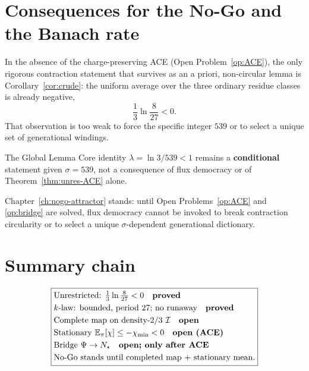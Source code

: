 \section{Consequences for the No-Go and the Banach rate}
\label{sec:conseq}

\begin{theorem}
\label{thm:only-qual}
In the absence of the charge-preserving ACE
(Open Problem~\ref{op:ACE}), the only rigorous contraction statement that
survives as an a priori, non-circular lemma is
Corollary~\ref{cor:crude}: the uniform average over the three ordinary residue
classes is already negative,
\[
\frac13\ln\frac{8}{27}<0.
\]
That observation is too weak to force the specific integer \(539\) or to select
a unique set of generational windings.
\end{theorem}

\begin{corollary}
\label{cor:banach-cond}
The Global Lemma Core identity \(\lambda=\ln 3/539<1\) remains a
\textbf{conditional} statement given \(\sigma=539\), not a consequence of
flux democracy or of Theorem~\ref{thm:unres-ACE} alone.
\end{corollary}

\begin{corollary}[No-Go unchanged]
\label{cor:nogo-stands}
Chapter~\ref{ch:nogo-attractor} stands: until Open Problems~\ref{op:ACE} and
\ref{op:bridge} are solved, flux democracy cannot be invoked to break
contraction circularity or to select a unique \(\sigma\)-dependent generational
dictionary.
\end{corollary}

\section{Summary chain}
\label{sec:ace-summary}

\begin{equation}
\boxed{
\begin{aligned}
&\text{Unrestricted: }
\tfrac13\ln\tfrac{8}{27}<0
\quad\text{\textbf{proved}}
\\
&\text{\(k\)-law: bounded, period \(27\); no runaway}
\quad\text{\textbf{proved}}
\\
&\text{Complete map on density-\(2/3\) }\mathcal{I}
\quad\text{\textbf{open}}
\\
&\text{Stationary }
\mathbb{E}_\pi[\chi]\le -\chi_{\min}<0
\quad\text{\textbf{open (ACE)}}
\\
&\text{Bridge }
\Psi\to N_\star
\quad\text{\textbf{open; only after ACE}}
\\
&\text{No-Go stands until completed map + stationary mean.}
\end{aligned}
}
\end{equation}

